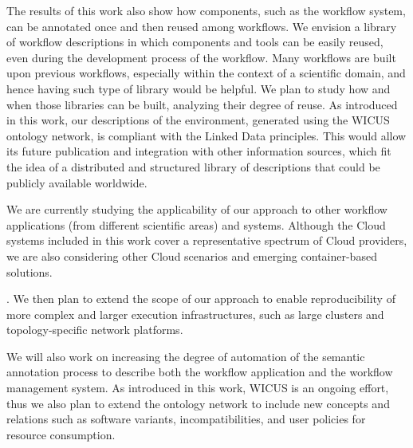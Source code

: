 The results of this work also show how components, such as the workflow 
system, can be annotated once and then reused among workflows. We 
envision a library of workflow descriptions in which components and tools 
can be easily reused, even during the development process of the workflow. 
Many workflows are built upon previous workflows, especially within the 
context of a scientific domain, and hence having such type of library would 
be helpful. We plan to study how and when those libraries can be built, 
analyzing their degree of reuse. As introduced in this work, our 
descriptions of the environment, generated using the WICUS ontology 
network, is compliant with the Linked Data principles. This would allow its 
future publication and integration with other information sources, which fit 
the idea of a distributed and structured library of descriptions that could be 
publicly available worldwide.

We are currently studying the applicability of our approach to other 
workflow applications (from different scientific areas) and systems. Although
the Cloud systems included in this work cover a representative spectrum of 
Cloud providers, we are also considering other Cloud scenarios and 
emerging container-based solutions. 

. We then plan to extend 
the scope of our approach to enable reproducibility of 
more complex and larger execution infrastructures, such as large clusters and topology-specific 
network platforms. 

We will also work on increasing  the degree of automation of the semantic annotation process to describe both the workflow application and the workflow management system. As introduced in this work, WICUS is an ongoing effort, thus we also plan to extend the ontology network to include new concepts and relations such as software variants, incompatibilities, and user policies for resource consumption.




